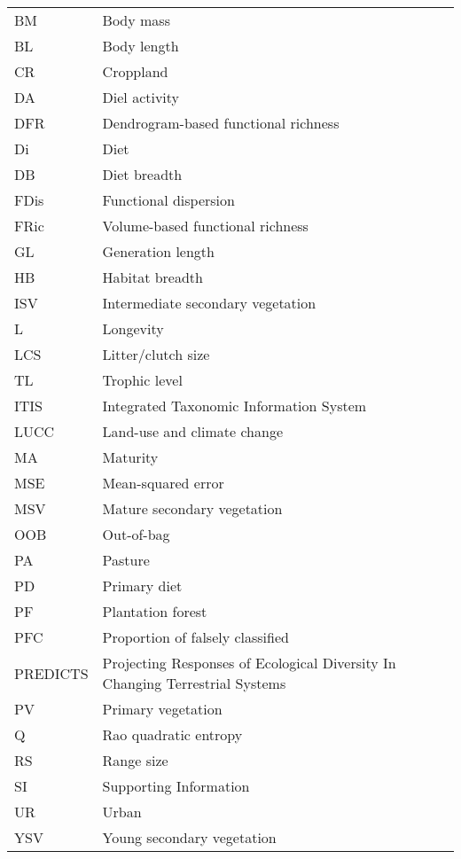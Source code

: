 \begin{table}[h!]
\renewcommand{\baselinestretch}{1.1}
\renewcommand{\arraystretch}{1}
\fontsize{10}{11}\selectfont
\begin{tabular}{ll}
BM & Body mass\\
BL & Body length\\
CR & Croppland \\
DA & Diel activity\\
DFR & Dendrogram-based functional richness\\
Di & Diet\\
DB & Diet breadth\\
FDis & Functional dispersion\\
FRic & Volume-based functional richness\\
GL & Generation length\\
HB & Habitat breadth\\
ISV & Intermediate secondary vegetation \\
L & Longevity\\
LCS & Litter/clutch size\\
TL & Trophic level\\
ITIS & Integrated Taxonomic Information System\\
LUCC & Land-use and climate change\\
MA & Maturity\\
MSE & Mean-squared error\\
MSV & Mature secondary vegetation \\
OOB & Out-of-bag \\
PA & Pasture \\
PD & Primary diet\\
PF & Plantation forest \\
PFC & Proportion of falsely classified\\
PREDICTS & Projecting Responses of Ecological Diversity In Changing Terrestrial Systems\\
PV & Primary vegetation \\
Q & Rao quadratic entropy\\
RS & Range size\\
SI & Supporting Information \\
UR & Urban \\
YSV & Young secondary vegetation
\end{tabular}
\end{table}